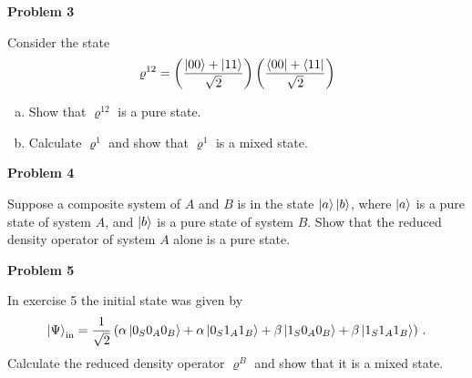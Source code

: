 \documentclass[a4paper,11pt]{article}
\newcommand{\Problem}[1]{
  {
  \vspace*{0.5cm}
  \textsf{\textbf{Problem #1}}
  \vspace*{0.2cm}
  
  }
}
\begin{document}
\Problem{3}
Consider the state
\begin{equation}
\varrho^{12} = \left(\frac{\ket{00}+\ket{11}}{\sqrt{2}}\right) \left(\frac{\bra{00}+\bra{11}}{\sqrt{2}}\right)
\end{equation}
\begin{enumerate}[a)]
\item Show that $\varrho^{12}$ is a pure state.
\item Calculate $\varrho^1$ and show that $\varrho^1$ is a mixed state.
\end{enumerate}

\Problem{4}
Suppose a composite system of $A$ and $B$ is in the state $\ket{a}\ket{b}$,
where $\ket{a}$ is a pure state of system $A$, and $\ket{b}$ is a pure state of
system $B$. Show that the reduced density operator of system $A$ alone is a
pure state.

\Problem{5}
In exercise 5 the initial state was given by
\begin{equation}
\ket{\Psi}_\text{in} = \frac{1}{\sqrt{2}} \left( \alpha\ket{0_S 0_A 0_B} + \alpha\ket{0_S 1_A 1_B} + \beta\ket{1_S 0_A 0_B} +\beta\ket{1_S 1_A 1_B} \right) \,.
\end{equation}
Calculate the reduced density operator $\varrho^B$ and show that it is a mixed state.
\end{document}
